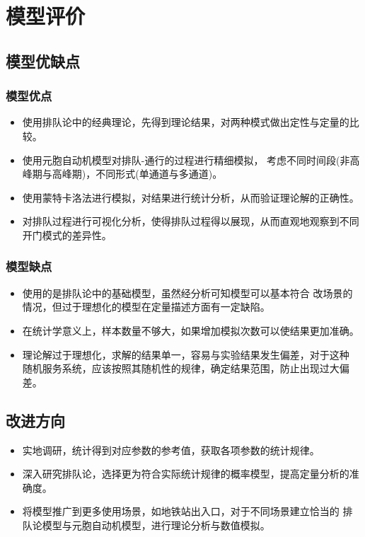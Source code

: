 \section{模型评价}
\subsection{模型优缺点}
\subsubsection{模型优点}
\begin{itemize}
    \item 使用排队论中的经典理论，先得到理论结果，对两种模式做出定性与定量的比较。
    \item 使用元胞自动机模型对排队-通行的过程进行精细模拟，
    考虑不同时间段(非高峰期与高峰期)，不同形式(单通道与多通道)。
    \item 使用蒙特卡洛法进行模拟，对结果进行统计分析，从而验证理论解的正确性。
    \item 对排队过程进行可视化分析，使得排队过程得以展现，从而直观地观察到不同开门模式的差异性。
\end{itemize}
\subsubsection{模型缺点}
\begin{itemize}
    \item 使用的是排队论中的基础模型，虽然经分析可知模型可以基本符合
    改场景的情况，但过于理想化的模型在定量描述方面有一定缺陷。
    \item 在统计学意义上，样本数量不够大，如果增加模拟次数可以使结果更加准确。
    \item 理论解过于理想化，求解的结果单一，容易与实验结果发生偏差，对于这种
    随机服务系统，应该按照其随机性的规律，确定结果范围，防止出现过大偏差。
\end{itemize}
\subsection{改进方向}
\begin{itemize}
    \item 实地调研，统计得到对应参数的参考值，获取各项参数的统计规律。
    \item 深入研究排队论，选择更为符合实际统计规律的概率模型，提高定量分析的准确度。
    \item 将模型推广到更多使用场景，如地铁站出入口，对于不同场景建立恰当的
    排队论模型与元胞自动机模型，进行理论分析与数值模拟。
\end{itemize}
